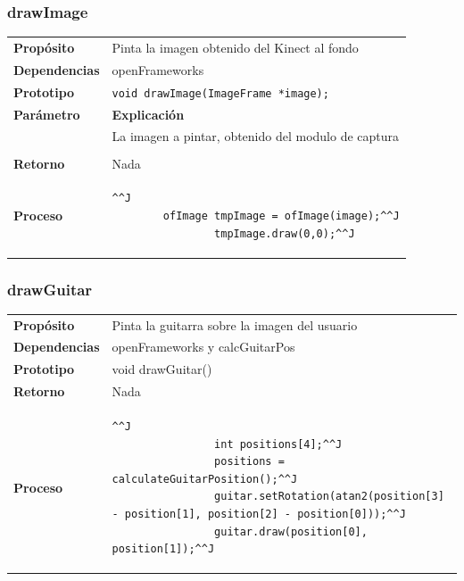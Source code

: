 \documentclass[a4paper,10pt]{article}
\begin{document}
\subsubsection{drawImage}
\begin{tabularx}{\textwidth}{p{25mm} X}
        \textbf{Propósito} & Pinta la imagen obtenido del Kinect al fondo\\
        \textbf{Dependencias} & openFrameworks \\
        \textbf{Prototipo} & \lstinline{void drawImage(ImageFrame *image);}\\
        \textbf{Parámetro} & \textbf{Explicación} \\
        \begin{tabular}{p{2cm} l}
               image & La imagen a pintar, obtenido del modulo de captura\\
        \end{tabular}\\

        \textbf{Retorno} & Nada\\
        \textbf{Proceso} & 
        \begin{lstlisting}[breaklines=true]^^J
        ofImage tmpImage = ofImage(image);^^J
                tmpImage.draw(0,0);^^J
        \end{lstlisting}

\end{tabularx}
\subsubsection{drawGuitar}
\begin{tabularx}{\textwidth}{p{25mm} X}
        \textbf{Propósito} & Pinta la guitarra sobre la imagen del usuario\\
        \textbf{Dependencias} & openFrameworks y calcGuitarPos\\
        \textbf{Prototipo} & void drawGuitar()\\
        \textbf{Retorno} & Nada \\
        \textbf{Proceso} & 
        \begin{lstlisting}[breaklines=true]^^J
                int positions[4];^^J
                positions = calculateGuitarPosition();^^J
                guitar.setRotation(atan2(position[3] - position[1], position[2] - position[0]));^^J
                guitar.draw(position[0], position[1]);^^J
        \end{lstlisting}
\end{tabularx}
\end{document}
